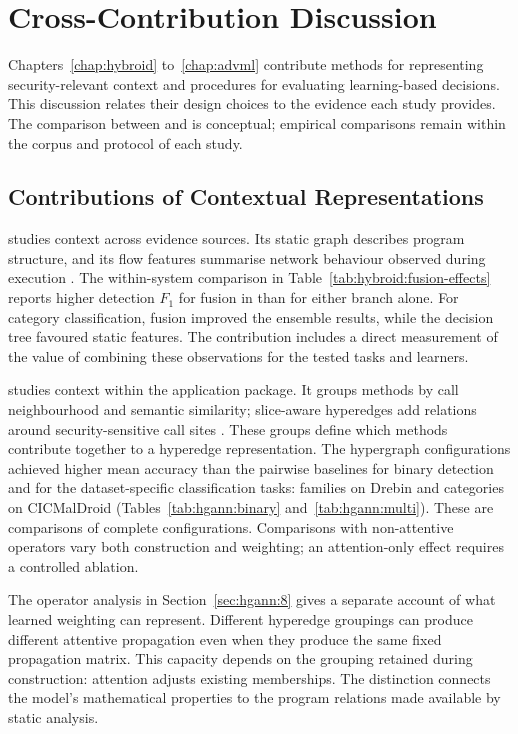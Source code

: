 \chapter{Cross-Contribution Discussion}
\label{chap:discussion}

Chapters~\ref{chap:hybroid} to~\ref{chap:advml} contribute methods for representing
security-relevant context and procedures for evaluating learning-based decisions. This
discussion relates their design choices to the evidence each study provides. The comparison
between \hybroid{} and \hgann{} is conceptual; empirical comparisons remain within the
corpus and protocol of each study.

\section{Contributions of Contextual Representations}
\label{sec:discussion:representations}
\label{sec:discussion:1}
\label{sec:discussion:2}

\hybroid{} studies context across evidence sources. Its static graph describes program
structure, and its flow features summarise network behaviour observed during execution
\cite{norouzian2021hybroid}. The within-system comparison in
Table~\ref{tab:hybroid:fusion-effects} reports higher detection $F_1$ for fusion in \hybroid{}
than for either branch alone. For category classification, fusion improved the ensemble results,
while the decision tree favoured static features. The contribution includes a direct
measurement of the value of combining these observations for the tested tasks and learners.

\hgann{} studies context within the application package. It groups methods by call
neighbourhood and semantic similarity; slice-aware hyperedges add relations around
security-sensitive call sites \cite{norouzian2025hgannmal}. These groups define which
methods contribute together to a hyperedge representation. The hypergraph configurations
achieved higher mean accuracy than the pairwise baselines for binary detection and for
the dataset-specific classification tasks: families on Drebin and categories on CICMalDroid
(Tables~\ref{tab:hgann:binary} and~\ref{tab:hgann:multi}). These are comparisons of complete
configurations. Comparisons with non-attentive operators vary both construction and
weighting; an attention-only effect requires a controlled ablation.

The operator analysis in Section~\ref{sec:hgann:8} gives a separate account of what learned
weighting can represent. Different hyperedge groupings can produce different attentive
propagation even when they produce the same fixed propagation matrix. This capacity depends
on the grouping retained during construction: attention adjusts existing memberships. The
distinction connects the model's mathematical properties to the program relations made
available by static analysis.

